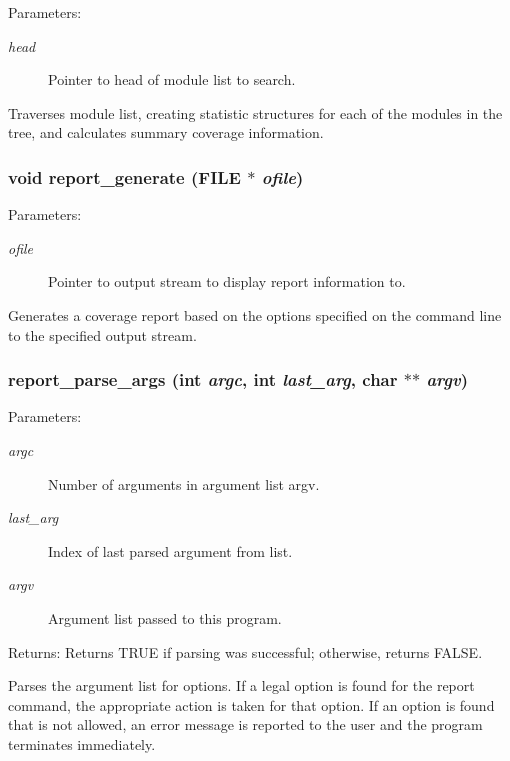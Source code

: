 \begin{Desc}
\item[Parameters:]
\begin{description}
\item[{\em head}]Pointer to head of module list to search.\end{description}
\end{Desc}
Traverses module list, creating statistic structures for each of the modules in the tree, and calculates summary coverage information. 
\subsubsection{\setlength{\rightskip}{0pt plus 5cm}void report\_\-generate (FILE $\ast$ {\em ofile})}\label{report_8c_a18}


\begin{Desc}
\item[Parameters:]
\begin{description}
\item[{\em ofile}]Pointer to output stream to display report information to.\end{description}
\end{Desc}
Generates a coverage report based on the options specified on the command line to the specified output stream. 
\subsubsection{ report\_\-parse\_\-args (int {\em argc}, int {\em last\_\-arg}, char $\ast$$\ast$ {\em argv})}\label{report_8c_a14}


\begin{Desc}
\item[Parameters:]
\begin{description}
\item[{\em argc}]Number of arguments in argument list argv. \item[{\em last\_\-arg}]Index of last parsed argument from list. \item[{\em argv}]Argument list passed to this program.\end{description}
\end{Desc}
\begin{Desc}
\item[Returns:]Returns TRUE if parsing was successful; otherwise, returns FALSE.\end{Desc}
Parses the argument list for options. If a legal option is found for the report command, the appropriate action is taken for that option. If an option is found that is not allowed, an error message is reported to the user and the program terminates immediately. 
